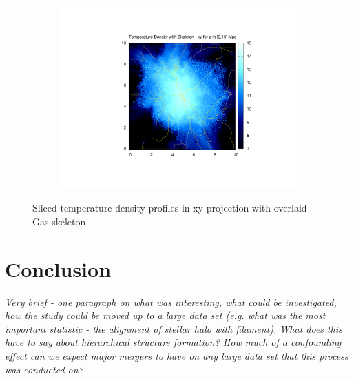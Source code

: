 \documentclass[journal]{IEEEtran}
\begin{document}
\begin{figure}[!t]
\begin{subfigure}[t]{0.3\textwidth}
		\includegraphics[width=\linewidth]{TempDenSkelall}
	\end{subfigure}
\label{fig:tempskel}
\caption{Sliced temperature density profiles in xy projection with overlaid Gas skeleton.}
\end{figure}

\section{Conclusion}
\textit{Very brief - one paragraph on what was interesting, what could be investigated, how the study could be moved up to a large data set (e.g. what was the most important statistic - the alignment of stellar halo with filament).
What does this have to say about hierarchical structure formation? How much of a confounding effect can we expect major mergers to have on any large data set that this process was conducted on?}


\appendices
\end{document}
